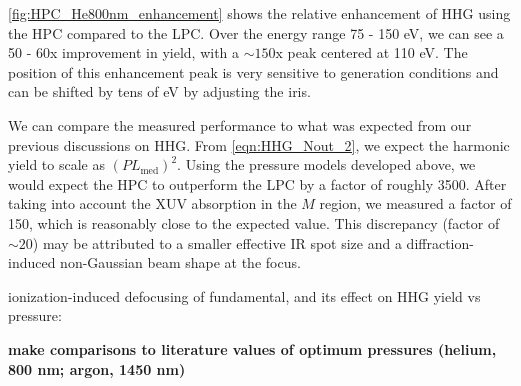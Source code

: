 \cref{fig:HPC_He800nm_enhancement} shows the relative enhancement of HHG using the HPC compared to the LPC. Over the energy range 75 - 150 eV, we can see a 50 - 60x improvement in yield, with a $\sim 150 \textrm{x}$ peak centered at 110 eV. The position of this enhancement peak is very sensitive to generation conditions and can be shifted by tens of eV by adjusting the iris.

We can compare the measured performance to what was expected from our previous discussions on HHG. From \cref{eqn:HHG_Nout_2}, we expect the harmonic yield to scale as $(PL_{\textrm{med}})^2$. Using the pressure models developed above, we would expect the HPC to outperform the LPC by a factor of roughly 3500. After taking into account the XUV absorption in the $M$ region, we measured a factor of 150, which is reasonably close to the expected value. This discrepancy (factor of $\sim 20$) may be attributed to a smaller effective IR spot size and a diffraction-induced non-Gaussian beam shape at the focus.

%

ionization-induced defocusing of fundamental, and its effect on HHG yield vs pressure: \cite{altucciInfluenceAtomicDensity1996}


\textbf{make comparisons to literature values of optimum pressures (helium, 800 nm; argon, 1450 nm)}


